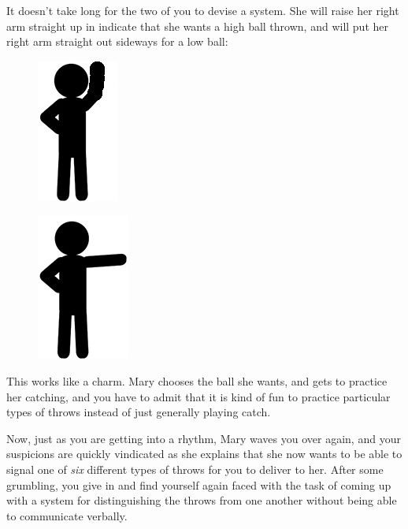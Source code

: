 \documentclass{book}
\begin{document}
It doesn't take long for the two of you to devise a system. She will raise her right arm straight up in indicate that she wants a high ball thrown, and will put her right arm straight out sideways for a low ball:

\begin{figure}[H]
\centering
\captionsetup{labelformat=empty}
\begin{minipage}{.4\textwidth}
  \centering
  \includegraphics[width=.3\linewidth]{stick-figure-arm-raised}
  \label{fig:test1}
\end{minipage}%
\begin{minipage}{.4\textwidth}
  \centering
  \includegraphics[width=.3\linewidth]{stick-figure-arm-sideways}
  \label{fig:test2}
\end{minipage}
\end{figure}

This works like a charm. Mary chooses the ball she wants, and gets to practice her catching, and you have to admit that it is kind of fun to practice particular types of throws instead of just generally playing catch.

Now, just as you are getting into a rhythm, Mary waves you over again, and your suspicions are quickly vindicated as she explains that she now wants to be able to signal one of \emph{six} different types of throws for you to deliver to her. After some grumbling, you give in and find yourself again faced with the task of coming up with a system for distinguishing the throws from one another without being able to communicate verbally.
\end{document}
